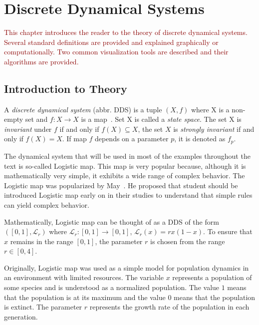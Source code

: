 \chapter{Discrete Dynamical Systems}

\textcolor{darkred}{
This chapter introduces the reader to the theory of discrete dynamical systems.
Several standard definitions are provided and explained graphically or computationally.
Two common visualization tools are described and their algorithms are provided.
}

\section{Introduction to Theory}

\begin{definition}
    A \emph{discrete dynamical system} (abbr. DDS) is a tuple $\left( X, f \right)$ where X is a non-empty set and $f: X \rightarrow X$ is a map~\cite{Brin20100706}.
    Set X is called a \emph{state space}.
    The set X is \emph{invariant} under $f$ if and only if $f(X) \subseteq X$, the set $X$ is \emph{strongly invariant} if and only if $f(X) = X$.
    If map $f$ depends on a parameter $p$, it is denoted as $f_p$.
\end{definition}

\begin{remark}
    The dynamical system that will be used in most of the examples throughout the text is so-called Logistic map.
    This map is very popular because, although it is mathematically very simple, it exhibits a wide range of complex behavior.
    The Logistic map was popularized by May~\cite{May19760610}.
    He proposed that student should be introduced Logistic map early on in their studies to understand that simple rules can yield complex behavior.
    \par
    Mathematically, Logistic map can be thought of as a DDS of the form $\left( [0, 1], \mathcal{L}_{r} \right)$ where $\mathcal{L}_{r}: [0,1] \rightarrow [0,1]$, $\mathcal{L}_{r}(x) = rx(1-x)$.
    To ensure that $x$ remains in the range $[0,1]$, the parameter $r$ is chosen from the range $r \in [0, 4]$.
    \par
    Originally, Logistic map was used as a simple model for population dynamics in an environment with limited resources.
    The variable $x$ represents a population of some species and is understood as a normalized population.
    The value $1$ means that the population is at its maximum and the value $0$ means that the population is extinct.
    The parameter $r$ represents the growth rate of the population in each generation. \cite{Strogatz201854}
\end{remark}

